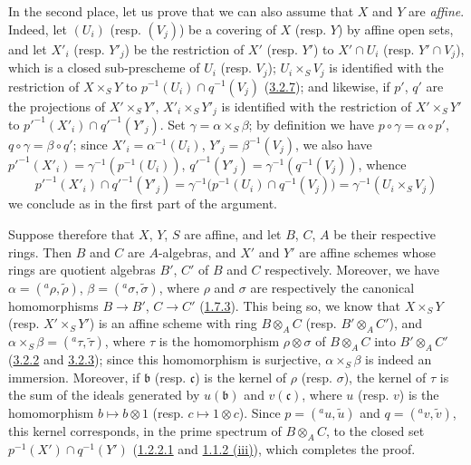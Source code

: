 In the second place, let us prove that we can also assume that $X$ and $Y$
are \emph{affine}. Indeed, let $(U_i)$ (resp. $(V_j)$) be a covering of $X$
(resp. $Y$) by affine open sets, and let $X'_i$ (resp. $Y'_j$) be the
restriction of $X'$ (resp. $Y'$) to $X'\cap U_i$ (resp. $Y'\cap V_j$), which
is a closed sub-prescheme of $U_i$ (resp. $V_j$); $U_i\times_S V_j$ is
identified with the restriction of $X\times_S Y$ to
$p^{-1}(U_i)\cap q^{-1}(V_j)$ (\hyperref[I.3.2.7]{3.2.7}); and likewise, if
$p'$, $q'$ are the projections of $X'\times_S Y'$,
$X'_i\times_S Y'_j$ is identified with the restriction of $X'\times_S Y'$ to
${p'}^{-1}(X'_i)\cap{q'}^{-1}(Y'_j)$. Set
$\gamma=\alpha\times_S\beta$; by definition we have
$p\circ\gamma=\alpha\circ p'$, $q\circ\gamma=\beta\circ q'$; since
$X'_i=\alpha^{-1}(U_i)$, $Y'_j=\beta^{-1}(V_j)$, we also have
${p'}^{-1}(X'_i)=\gamma^{-1}(p^{-1}(U_i))$,
${q'}^{-1}(Y'_j)=\gamma^{-1}(q^{-1}(V_j))$, whence
\[
  {p'}^{-1}(X'_i)\cap{q'}^{-1}(Y'_j)
  =\gamma^{-1}\bigl(p^{-1}(U_i)\cap q^{-1}(V_j)\bigr)
  =\gamma^{-1}(U_i\times_S V_j)
\]
we conclude as in the first part of the argument.

Suppose therefore that $X$, $Y$, $S$ are affine, and let $B$, $C$, $A$ be their
respective rings. Then $B$ and $C$ are $A$-algebras, and $X'$ and $Y'$ are
affine schemes whose rings are quotient algebras $B'$, $C'$ of $B$ and
$C$ respectively. Moreover, we have
$\alpha=({}^a\rho,\widetilde{\rho})$, $\beta=({}^a\sigma,\widetilde{\sigma})$,
where $\rho$ and $\sigma$ are respectively the canonical homomorphisms
$B\to B'$, $C\to C'$ (\hyperref[I.1.7.3]{1.7.3}). This being so, we know
that $X\times_S Y$ (resp. $X'\times_S Y'$) is an affine scheme with ring
$B\otimes_A C$ (resp. $B'\otimes_A C'$), and
$\alpha\times_S\beta=({}^a\tau,\widetilde{\tau})$, where $\tau$ is
the homomorphism $\rho\otimes\sigma$ of $B\otimes_A C$ into
$B'\otimes_A C'$ (\hyperref[I.3.2.2]{3.2.2} and
\hyperref[I.3.2.3]{3.2.3}); since this homomorphism is surjective,
$\alpha\times_S\beta$ is indeed an immersion. Moreover, if $\mathfrak{b}$
(resp. $\mathfrak{c}$) is the kernel of $\rho$ (resp. $\sigma$), the kernel of
$\tau$ is the sum of the ideals generated by $u(\mathfrak{b})$ and $v(\mathfrak{c})$, where $u$ (resp. $v$) is
the homomorphism $b\mapsto b\otimes1$ (resp. $c\mapsto1\otimes c$). Since
$p=({}^a u,\widetilde{u})$ and $q=({}^a v,\widetilde{v})$, this kernel
corresponds, in the prime spectrum of $B\otimes_A C$, to the closed set
$p^{-1}(X')\cap q^{-1}(Y')$ (\hyperref[I.1.2.2.1]{1.2.2.1} and
\hyperref[I.1.1.2]{1.1.2 (iii)}), which completes the proof.

